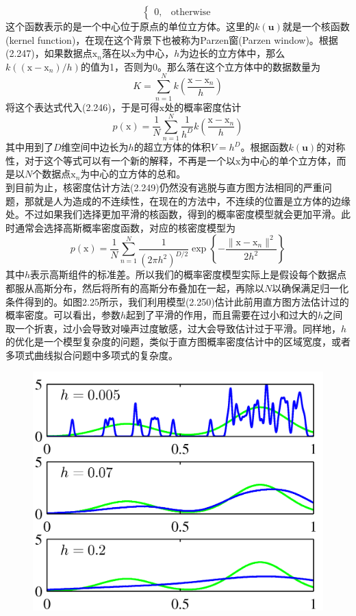 \documentclass[b5paper]{book}
\numberwithin{equation}{chapter}
\newcommand {\bx} {\boldsymbol{\mathrm{x}}}
\begin{document}
{\begin{equation}
\begin{cases}
		0,&\text{otherwise}
		\end{cases}
	\end{equation}
	这个函数表示的是一个中心位于原点的单位立方体。这里的$k(\mathbf{u})$就是一个核函数(kernel function)，在现在这个背景下也被称为Parzen窗(Parzen window)。根据(2.247)，如果数据点$\bx_n$落在以$\bx$为中心，$h$为边长的立方体中，那么$k((\bx-\bx_n)/h)$的值为1，否则为0。那么落在这个立方体中的数据数量为
	\begin{equation}
		K = \sum_{n=1}^N k\left(\frac{\bx-\bx_n}{h}\right)
	\end{equation}
	将这个表达式代入(2.246)，于是可得$\bx$处的概率密度估计
	\begin{equation}
		p(\bx)=\frac{1}{N}\sum_{n=1}^N \frac{1}{h^D}k\left(\frac{\bx-\bx_n}{h}\right)
	\end{equation}
	其中用到了$D$维空间中边长为$h$的超立方体的体积$V=h^D$。根据函数$k(\mathbf{u})$的对称性，对于这个等式可以有一个新的解释，不再是一个以$\bx$为中心的单个立方体，而是以$N$个数据点$\bx_n$为中心的立方体的总和。\\
	\indent 到目前为止，核密度估计方法(2.249)仍然没有逃脱与直方图方法相同的严重问题，那就是人为造成的不连续性，在现在的方法中，不连续的位置是立方体的边缘处。不过如果我们选择更加平滑的核函数，得到的概率密度模型就会更加平滑。此时通常会选择高斯概率密度函数，对应的核密度模型为
	\begin{equation}
		p(\bx)=\frac{1}{N}\sum_{n=1}^N \frac{1}{(2 \pi h^2)^{D/2}}\exp\left\{-\frac{\|\bx-\bx_n\|^2}{2h^2}\right\}
	\end{equation}
	其中$h$表示高斯组件的标准差。所以我们的概率密度模型实际上是假设每个数据点都服从高斯分布，然后将所有的高斯分布叠加在一起，再除以$N$以确保满足归一化条件得到的。如图2.25所示，我们利用模型(2.250)估计此前用直方图方法估计过的概率密度。可以看出，参数$h$起到了平滑的作用，而且需要在过小和过大的$h$之间取一个折衷，过小会导致对噪声过度敏感，过大会导致估计过于平滑。同样地，$h$的优化是一个模型复杂度的问题，类似于直方图概率密度估计中的区域宽度，或者多项式曲线拟合问题中多项式的复杂度。
	\begin{figure}[ht]
		\centering
		\includegraphics[scale=0.8]{Images/2-25.png}

\end{figure}}
\end{document}

